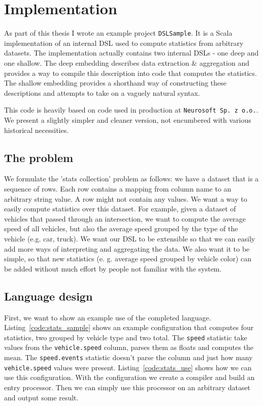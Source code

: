 \chapter{Implementation}

As part of this thesis I wrote an example project \texttt{DSLSample}. It is a Scala implementation of an internal DSL used to compute statistics from arbitrary datasets. The implementation actually contains two internal DSLs - one deep and one shallow. The deep embedding describes data extraction \& aggregation and provides a way to compile this description into code that computes the statistics. The shallow embedding provides a shorthand way of constructing these descriptions and attempts to take on a vaguely natural syntax.

This code is heavily based on code used in production at \texttt{Neurosoft~Sp.~z~o.o.}. We present a slightly simpler and cleaner version, not encumbered with various historical necessities.

\section{The problem}

We formulate the 'stats collection' problem as follows: we have a dataset that is a sequence of rows. Each row contains a mapping from column name to an arbitrary string value. A row might not contain any values. We want a way to easily compute statistics over this dataset. For example, given a dataset of vehicles that passed through an intersection, we want to compute the average speed of all vehicles, but also the average speed grouped by the type of the vehicle (e.g. car, truck). We want our DSL to be extensible so that we can easily add more ways of interpreting and aggregating the data. We also want it to be simple, so that new statistics (e. g. average speed grouped by vehicle color) can be added without much effort by people not familiar with the system.

\section{Language design}

First, we want to show an example use of the completed language. Listing~\ref{code:stats_sample} shows an example configuration that computes four statistics, two grouped by vehicle type and two total. The \texttt{speed} statistic take values from the \texttt{vehicle.speed} column, parses them as floats and computes the mean. The \texttt{speed.events} statistic doesn't parse the column and just how many \texttt{vehicle.speed} values were present. Listing~\ref{code:stats_use} shows how we can use this configuration. With the configuration we create a compiler and build an entry processor. Then we can simply use this processor on an arbitrary dataset and output some result.

